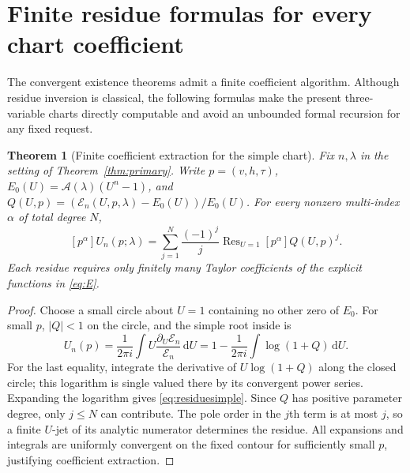 \documentclass[11pt,a4paper]{article}
\numberwithin{equation}{section}
\newtheorem{theorem}{Theorem}[section]
\theoremstyle{definition}\newtheorem{definition}[theorem]{Definition}
\theoremstyle{remark}\newtheorem{remark}[theorem]{Remark}
\DeclareMathOperator{\Res}{Res}
\newcommand{\dd}{\,\mathrm d}\newcommand{\eps}{\varepsilon}
\newcommand{\A}{\mathcal A}\newcommand{\E}{\mathcal E}
\begin{document}
\section{Finite residue formulas for every chart coefficient}
\label{sec:coefficients}
The convergent existence theorems admit a finite coefficient algorithm.
Although residue inversion is classical, the following formulas make the
present three-variable charts directly computable and avoid an unbounded
formal recursion for any fixed request.

\begin{theorem}[Finite coefficient extraction for the simple chart]
\label{thm:residuesimple}
Fix $n,\lambda$ in the setting of Theorem~\ref{thm:primary}. Write
$p=(v,h,\tau)$,
$E_0(U)=\A(\lambda)(U^n-1)$, and
$Q(U,p)=(\E_n(U,p,\lambda)-E_0(U))/E_0(U)$.
For every nonzero multi-index $\alpha$ of total degree $N$,
\begin{equation}\label{eq:residuesimple}
 [p^\alpha]U_n(p;\lambda)=
 \sum_{j=1}^{N}\frac{(-1)^j}{j}
       \Res_{U=1}[p^\alpha]Q(U,p)^j.
\end{equation}
Each residue requires only finitely many Taylor coefficients of the
explicit functions in \eqref{eq:E}.
\end{theorem}
\begin{proof}
Choose a small circle about $U=1$ containing no other zero of $E_0$.
For small $p$, $|Q|<1$ on the circle, and the simple root inside is
\[
 U_n(p)=\frac1{2\pi i}\int U\frac{\partial_U\E_n}{\E_n}\dd U
 =1-\frac1{2\pi i}\int\log(1+Q)\dd U.
\]
For the last equality, integrate the derivative of $U\log(1+Q)$ along
the closed circle; this logarithm is single valued there by its convergent
power series. Expanding the logarithm gives \eqref{eq:residuesimple}.
Since $Q$ has positive parameter degree, only $j\le N$ can contribute.
The pole order in the $j$th term is at most $j$, so a finite $U$-jet of
its analytic numerator determines the residue. All expansions and
integrals are uniformly convergent on the fixed contour for sufficiently
small $p$, justifying coefficient extraction.
\end{proof}
\end{document}
